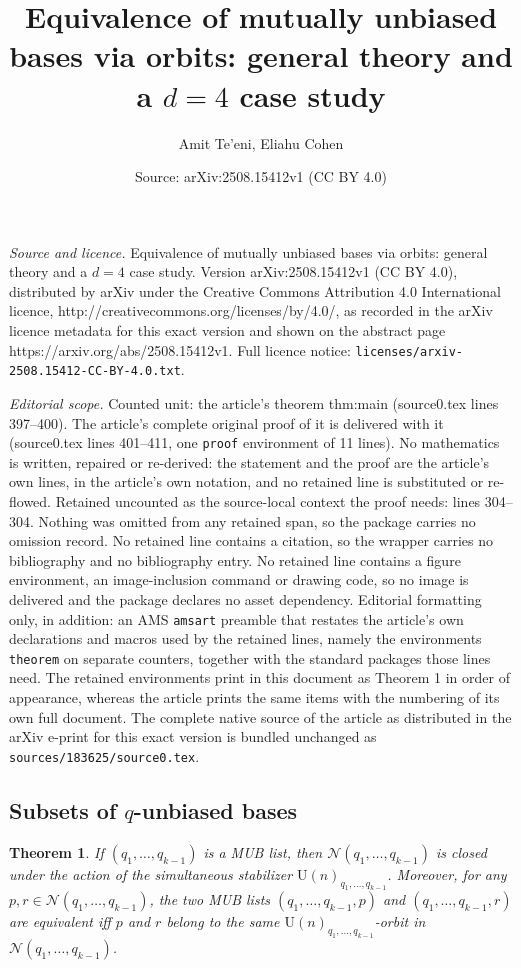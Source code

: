 \documentclass[10pt,a4paper]{amsart}
\title{Equivalence of mutually unbiased bases via orbits: general theory and a $d=4$ case study}
\author{Amit Te'eni, Eliahu Cohen}
\date{Source: arXiv:2508.15412v1 (CC BY 4.0)}
\newtheorem{theorem}{Theorem}
\begin{document}
\maketitle

\noindent\emph{Source and licence.} Equivalence of mutually unbiased bases via orbits: general theory and a $d=4$ case study. Version arXiv:2508.15412v1 (CC BY 4.0), distributed by arXiv under the Creative Commons Attribution 4.0 International licence, http://creativecommons.org/licenses/by/4.0/, as recorded in the arXiv licence metadata for this exact version and shown on the abstract page https://arxiv.org/abs/2508.15412v1. Full licence notice: \texttt{licenses/arxiv-2508.15412-CC-BY-4.0.txt}.\par\smallskip

\noindent\textit{Editorial scope.} Counted unit: the article's theorem thm:main (source0.tex lines 397--400). The article's complete original proof of it is delivered with it (source0.tex lines 401--411, one \texttt{proof} environment of 11 lines). No mathematics is written, repaired or re-derived: the statement and the proof are the article's own lines, in the article's own notation, and no retained line is substituted or re-flowed.  Retained uncounted as the source-local context the proof needs: lines 304--304.  Nothing was omitted from any retained span, so the package carries no omission record.  No retained line contains a citation, so the wrapper carries no bibliography and no bibliography entry.  No retained line contains a figure environment, an image-inclusion command or drawing code, so no image is delivered and the package declares no asset dependency.  Editorial formatting only, in addition: an AMS \texttt{amsart} preamble that restates the article's own declarations and macros used by the retained lines, namely the environments \texttt{theorem} on separate counters, together with the standard packages those lines need.  The retained environments print in this document as Theorem 1 in order of appearance, whereas the article prints the same items with the numbering of its own full document.  The complete native source of the article as distributed in the arXiv e-print for this exact version is bundled unchanged as \texttt{sources/183625/source0.tex}.
\subsection{Subsets of $q$-unbiased bases}\label{sec:Vq}

\begin{theorem}\label{thm:main}
	If $ \left( q_1, \ldots, q_{k-1} \right) $ is a MUB list, then $ \mathcal{N} \left( q_1, \ldots, q_{k-1} \right) $ is closed under the action of the simultaneous stabilizer  $ \mathrm{U} \left( n \right)_{q_1, \ldots, q_{k-1} } $.
	Moreover, for any $p,r \in \mathcal{N} \left( q_1, \ldots, q_{k-1} \right) $, the two MUB lists $ \left( q_1, \ldots, q_{k-1}, p \right) $ and $ \left( q_1, \ldots, q_{k-1}, r \right) $ are equivalent iff $p$ and $r$ belong to the same $\mathrm{U} \left( n \right)_{q_1, \ldots, q_{k-1} }$-orbit in $ \mathcal{N} \left( q_1, \ldots, q_{k-1} \right) $.
\end{theorem}
\end{document}

